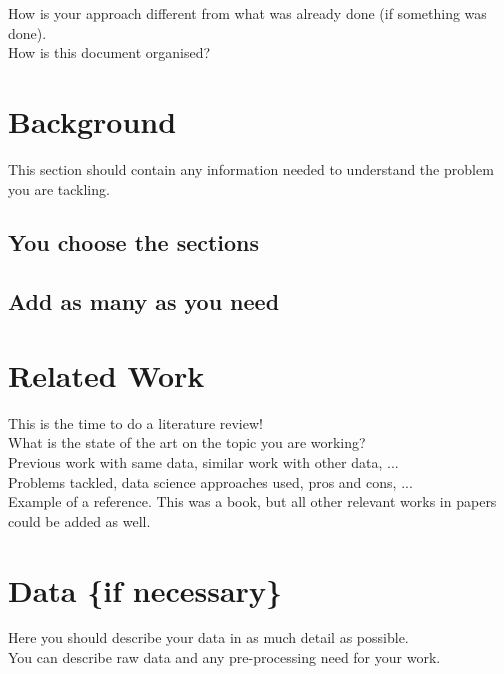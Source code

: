 \documentclass[sigplan]{acmart}
\begin{document}
How is your approach different from what was already done (if something was done). \\

How is this document organised? \\

\section{Background} \label{sec:background}

This section should contain any information needed to understand the problem you are tackling.

\subsection{You choose the sections} 



\subsection{Add as many as you need} 


\section{Related Work} \label{sec:relatedwork}

This is the time to do a literature review! \\

What is the state of the art on the topic you are working? \\

Previous work with same data, similar work with other data, ... \\

Problems tackled, data science approaches used, pros and cons, ... \\ 


Example of a reference\cite{lamport1994}. This was a book, but all other relevant works in papers \cite{turing1937} could be added as well.

\section{Data \{if necessary\} } \label{sec:data}

Here you should describe your data in as much detail as possible. \\ 

You can describe raw data and any pre-processing need for your work. \\
\end{document}
